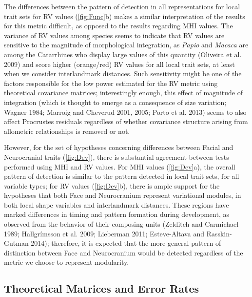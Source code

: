 \documentclass[12pt,]{article}
\begin{document}
The differences between the pattern of detection in all representations
for local trait sets for RV values (\autoref{fig:Func}b) makes a similar
interpretation of the results for this metric difficult, as opposed to
the results regarding MHI values. The variance of RV values among
species seems to indicate that RV values are sensitive to the magnitude
of morphological integration, as \emph{Papio} and \emph{Macaca} are
among the Catarrhines who display large values of this quantity
(Oliveira et al. 2009) and score higher (orange/red) RV values for all
local trait sets, at least when we consider interlandmark distances.
Such sensitivity might be one of the factors responsible for the low
power estimated for the RV metric using theoretical covariance matrices;
interestingly enough, this effect of magnitude of integration (which is
thought to emerge as a consequence of size variation; Wagner 1984;
Marroig and Cheverud 2001, 2005; Porto et al. 2013) seems to also affect
Procrustes residuals regardless of whether covariance structure arising
from allometric relationships is removed or not.

However, for the set of hypotheses concerning differences between Facial
and Neurocranial traits (\autoref{fig:Dev}), there is substantial
agreement between tests performed using MHI and RV values. For MHI
values (\autoref{fig:Dev}a), the overall pattern of detection is similar
to the pattern detected in local trait sets, for all variable types; for
RV values (\autoref{fig:Dev}b), there is ample support for the
hypotheses that both Face and Neurocranium represent variational
modules, in both local shape variables and interlandmark distances.
These regions have marked differences in timing and pattern formation
during development, as observed from the behavior of their composing
units (Zelditch and Carmichael 1989; Hallgrímsson et al. 2009; Lieberman
2011; Esteve-Altava and Rasskin-Gutman 2014); therefore, it is expected
that the more general pattern of distinction between Face and
Neurocranium would be detected regardless of the metric we choose to
represent modularity.

\subsection{Theoretical Matrices and Error
Rates}\label{theoretical-matrices-and-error-rates}
\end{document}
